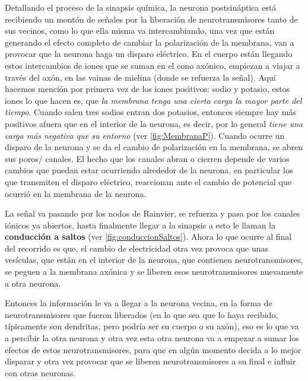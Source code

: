Detallando el proceso de la sinapsis química, la neurona postsináptica está recibiendo un montón de señales por la liberación de neurotransmisores tanto de sus vecinos, como lo que ella misma va intercambiando, una vez que están generando el efecto completo de cambiar la polarización de la membrana, van a provocar que la neurona haga un disparo eléctrico. En el cuerpo están llegando estos intercambios de iones que se suman en el cono axónico, empiezan a viajar a través del axón, en las vainas de mielina (donde se refuerza la señal). 
Aquí hacemos mención por primera vez de los iones positivos: sodio y potasio, estos iones lo que hacen es, que \emph{la membrana tenga una cierta carga la mayor parte del tiempo}. Cuando salen tres sodios entran dos potasios, entonces siempre hay más positivos afuera que en el interior de la neurona, es decir, por lo general  \emph{tiene una carga más negativa que su entorno} (ver \ref{fig:MembranaP}). Cuando ocurre un disparo de la neurona y se da el cambio de polarización en la membrana, se abren sus poros/ canales. El hecho que los canales abran o cierren depende de varios cambios que puedan estar ocurriendo alrededor de la neurona, en particular los que transmiten el disparo eléctrico, reaccionan ante el cambio de potencial que ocurrió en la membrana de la neurona. 


La señal va pasando por los nodos de Rainvier, se refuerza y pasa por los canales iónicos ya abiertos, hasta finalmente llegar a la sinapsis a esto le llaman la \textbf{conducción a saltos} (ver \ref{fig:conduccionSaltos}). Ahora lo que ocurre al final del recorrido es que, el cambio de electricidad otra vez provoca que unas vesículas, que están en el interior de la neurona, que contienen neurotransmisores, se peguen a la membrana axónica y se liberen esos neurotransmisores nuevamente a otra neurona. 


Entonces la información le va a llegar a la neurona vecina, en la forma de neurotransmisores que fueron liberados (en lo que sea que lo haya recibido, típicamente son dendritas, pero podría ser su cuerpo o su axón), eso es lo que va a percibir la otra neurona y otra vez esta otra neurona va a empezar a sumar los efectos de estos neurotransmisores, para que en algún momento decida a lo mejor disparar y otra vez provocar que se liberen neurotransmisores a su final e influir con otras neuronas.


